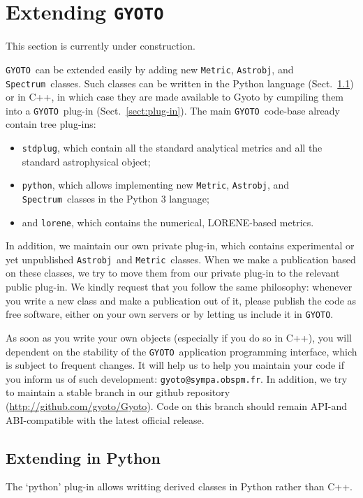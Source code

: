 \documentclass[a4paper,12pt]{article}
\newcommand{\GYOTO}{\texttt{GYOTO}}
\newcommand{\Metric}{\texttt{Metric}}
\newcommand{\Astrobj}{\texttt{Astrobj}}
\newcommand{\Spectrum}{\texttt{Spectrum}}
\begin{document}
\section{Extending \GYOTO}

This section is currently under construction.

\GYOTO\ can be extended easily by adding new \Metric, \Astrobj, and
\Spectrum\ classes. Such classes can be written in the Python language
(Sect.~\ref{sect:python-plug-in}) or in C++, in which case they are made
available to Gyoto by cumpiling them into a \GYOTO\ plug-in
(Sect.~\ref{sect:plug-in}). The main \GYOTO\ code-base already contain
tree plug-ins:
\begin{itemize}
\item \texttt{stdplug}, which contain all the standard analytical
  metrics and all the standard astrophysical object;
\item \texttt{python}, which allows implementing new \Metric,
  \Astrobj, and \Spectrum\ classes in the Python 3 language;
\item and \texttt{lorene}, which contains the numerical, LORENE-based
  metrics.
\end{itemize}
In addition, we maintain our own private plug-in, which contains
experimental or yet unpublished \Astrobj\ and \Metric\ classes. When
we make a publication based on these classes, we try to move them from
our private plug-in to the relevant public plug-in. We kindly request
that you follow the same philosophy: whenever you write a new class
and make a publication out of it, please publish the code as free
software, either on your own servers or by letting us include it in
\GYOTO.

As soon as you write your own objects (especially if you do so in
C++), you will dependent on the stability of the \GYOTO\ application
programming interface, which is subject to frequent changes. It will
help us to help you maintain your code if you inform us of such
development: \texttt{gyoto@sympa.obspm.fr}. In addition, we try to
maintain a stable branch in our github repository
(\url{http://github.com/gyoto/Gyoto}). Code on this branch should
remain API-and ABI-compatible with the latest official release.

\subsection{Extending in Python}
\label{sect:python-plug-in}
The `python' plug-in allows writting derived classes
in Python rather than C++.
\end{document}
